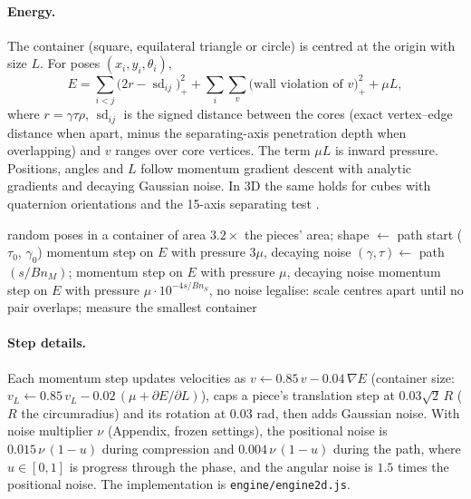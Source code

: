 \paragraph{Energy.} The container (square, equilateral triangle or circle) is centred at the origin with size $L$. For poses $(x_i,y_i,\theta_i)$,
\[
E=\sum_{i<j}\big(2r-\operatorname{sd}_{ij}\big)_+^2+\sum_{i}\sum_{v}\big(\text{wall violation of }v\big)_+^2+\mu L,
\]
where $r=\gamma\tau\rho$, $\operatorname{sd}_{ij}$ is the signed distance between the cores (exact vertex--edge distance when apart, minus the separating-axis penetration depth when overlapping) and $v$ ranges over core vertices. The term $\mu L$ is inward pressure. Positions, angles and $L$ follow momentum gradient descent with analytic gradients and decaying Gaussian noise. In 3D the same holds for cubes with quaternion orientations and the 15-axis separating test \cite{nakajima12}.

\begin{algorithm}[t]\caption{One run of a gradient path (budget factor $B$; base $n_C,n_M,n_S=2500,7500,1500$ steps).}\label{alg:run}
\small
\begin{algorithmic}[1]
\State random poses in a container of area $3.2\times$ the pieces' area; shape $\leftarrow$ path start ($\tau_0$, $\gamma_0$)
 
\State momentum step on $E$ with pressure $3\mu$, decaying noise
\EndFor
{} 
\State $(\gamma,\tau)\leftarrow$ path$(s/Bn_M)$; momentum step on $E$ with pressure $\mu$, decaying noise
\EndFor
{} 
\State momentum step on $E$ with pressure $\mu\cdot10^{-4s/Bn_S}$, no noise
\EndFor
\State legalise: scale centres apart until no pair overlaps; measure the smallest container
\end{algorithmic}
\end{algorithm}

\paragraph{Step details.} Each momentum step updates velocities as $v\leftarrow0.85\,v-0.04\,\nabla E$ (container size: $v_L\leftarrow0.85\,v_L-0.02\,(\mu+\partial E/\partial L)$), caps a piece's translation step at $0.03\sqrt2\,R$ ($R$ the circumradius) and its rotation at $0.03$ rad, then adds Gaussian noise. With noise multiplier $\nu$ (Appendix, frozen settings), the positional noise is $0.015\,\nu\,(1-u)$ during compression and $0.004\,\nu\,(1-u)$ during the path, where $u\in[0,1]$ is progress through the phase, and the angular noise is $1.5$ times the positional noise. The implementation is \texttt{engine/engine2d.js}.


